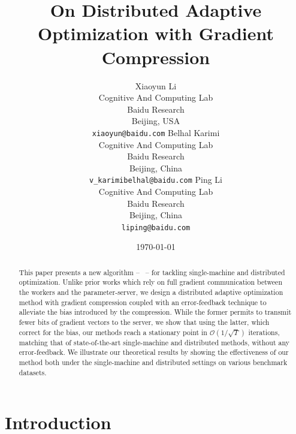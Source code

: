 \documentclass[11pt]{article}
\begin{document}
\title{On Distributed Adaptive Optimization with Gradient Compression}

\author{
Xiaoyun Li \\
  Cognitive And Computing Lab\\
  Baidu Research\\
  Beijing, USA \\
  \texttt{xiaoyun@baidu.com} 
   \And
  Belhal Karimi \\
  Cognitive And Computing Lab\\
  Baidu Research\\
  Beijing, China \\
  \texttt{v_karimibelhal@baidu.com} 
   \And
  Ping Li \\
  Cognitive And Computing Lab\\
  Baidu Research\\
  Beijing, China \\
  \texttt{liping@baidu.com} \\
}

\date{\today}

\maketitle

\vspace{-0.1in}
\begin{abstract}
This paper presents a new algorithm -- \algo\ -- for tackling single-machine and distributed optimization.
Unlike prior works which rely on full gradient communication between the workers and the parameter-server, we design a distributed adaptive optimization method with gradient compression coupled with an error-feedback technique to alleviate the bias introduced by the compression.
While the former permits to transmit fewer bits of gradient vectors to the server, we show that using the latter, which correct for the bias, our methods reach a stationary point in $\mathcal{O}(1/ \sqrt{T})$ iterations, matching that of state-of-the-art single-machine and distributed methods, without any error-feedback.
We illustrate our theoretical results by showing the effectiveness of our method both under the single-machine and distributed settings on various benchmark datasets.
\end{abstract}

\vspace{-0.05in}
\section{Introduction}\label{sec:introduction}
\vspace{-0.05in}
\end{document}
